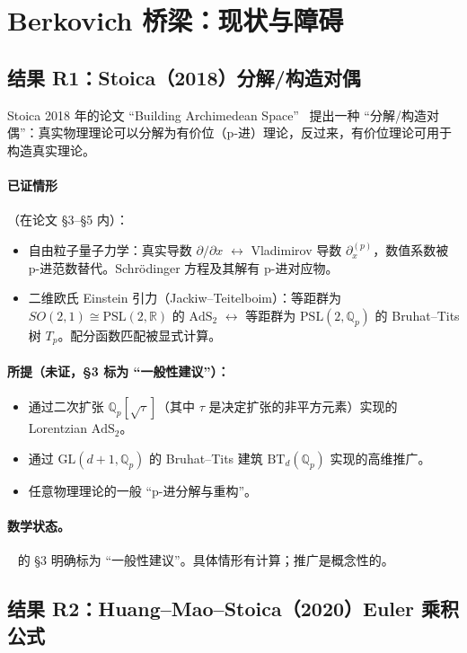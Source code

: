 \documentclass[11pt,a4paper]{ctexart}
\theoremstyle{remark}
\newcommand{\Qp}{\mathbb{Q}_p}
\newcommand{\R}{\mathbb{R}}
\newcommand{\Tp}{T_p}
\newcommand{\GL}{\mathrm{GL}}
\newcommand{\PSL}{\mathrm{PSL}}
\newcommand{\AdS}{\mathrm{AdS}}
\newcommand{\BirTits}{Bruhat--Tits}
\begin{document}
\section{Berkovich 桥梁：现状与障碍}
\label{sec:berkovich}

\subsection{结果 R1：Stoica（2018）分解/构造对偶}

Stoica 2018 年的论文 ``Building Archimedean Space''~\cite{S18} 提出一种 ``分解/构造对偶''：真实物理理论可以分解为有价位（p-进）理论，反过来，有价位理论可用于构造真实理论。

\paragraph{已证情形}（在论文 \S3--\S5 内）：
\begin{itemize}[leftmargin=2em]
    \item 自由粒子量子力学：真实导数 $\partial/\partial x$ $\leftrightarrow$ Vladimirov 导数 $\partial^{(p)}_x$，数值系数被 p-进范数替代。Schr\"odinger 方程及其解有 p-进对应物。
    \item 二维欧氏 Einstein 引力（Jackiw--Teitelboim）：等距群为 $SO(2,1) \cong \PSL(2,\R)$ 的 $\AdS_2$ $\leftrightarrow$ 等距群为 $\PSL(2,\Qp)$ 的 \BirTits{} 树 $\Tp$。配分函数匹配被显式计算。
\end{itemize}

\paragraph{所提（未证，\S3 标为 ``一般性建议''）：}
\begin{itemize}[leftmargin=2em]
    \item 通过二次扩张 $\Qp[\sqrt{\tau}]$（其中 $\tau$ 是决定扩张的非平方元素）实现的 Lorentzian $\AdS_2$。
    \item 通过 $\GL(d+1, \Qp)$ 的 \BirTits{} 建筑 $\mathrm{BT}_d(\Qp)$ 实现的高维推广。
    \item 任意物理理论的一般 ``p-进分解与重构''。
\end{itemize}

\paragraph{数学状态。}
~\cite{S18} 的 \S3 明确标为 ``一般性建议''。具体情形有计算；推广是概念性的。

\subsection{结果 R2：Huang--Mao--Stoica（2020）Euler 乘积公式}
\end{document}
